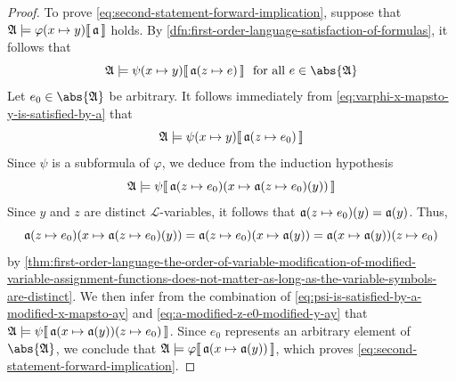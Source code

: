 \begin{proof}
    \vspace{0.3cm}
    \noindent
    To prove \eqref{eq:second-statement-forward-implication}, suppose that
    \( \folwffsatisfaction{\mathfrak{A}}{ \folfreevariablereplacement{\varphi}{x}{y} }{\mathfrak{a}} \) holds.
    By \cref{dfn:first-order-language-satisfaction-of-formulas}, it follows that
    \begin{equation}
        \label{eq:varphi-x-mapsto-y-is-satisfied-by-a}
        \folwffsatisfaction{\mathfrak{A}}{ \folfreevariablereplacement{\psi}{x}{y} }{ \folmodifiedvariableassignmentfunction{\mathfrak{a}}{z}{e} }
        \ \ \text{for all} \ e \in \abs{\mathfrak{A}}
    \end{equation}
    Let \( e_{0} \in \abs{\mathfrak{A}} \) be arbitrary. It follows immediately from \eqref{eq:varphi-x-mapsto-y-is-satisfied-by-a} that
    \begin{equation}
        \label{eq:psi-x-mapsto-y-is-satisfied-by-modified-a-z-mapsto-e0}
        \folwffsatisfaction{\mathfrak{A}}{ \folfreevariablereplacement{\psi}{x}{y} }{ \folmodifiedvariableassignmentfunction{\mathfrak{a}}{z}{e_{0}} }
    \end{equation}
    Since \( \psi \) is a subformula of \( \varphi \), we deduce from the induction hypothesis
    \begin{equation}
        \label{eq:psi-is-satisfied-by-a-modified-x-mapsto-ay}
        \folwffsatisfaction{\mathfrak{A}}{\psi}{ \folmodifiedvariableassignmentfunction{ \folmodifiedvariableassignmentfunction{\mathfrak{a}}{z}{e_{0}} }{x}{ \folmodifiedvariableassignmentfunction{\mathfrak{a}}{z}{e_{0}}(y) } }
    \end{equation}
    Since \( y \) and \( z \) are distinct \( \mathcal{L} \)-variables, it follows that \( \folmodifiedvariableassignmentfunction{\mathfrak{a}}{z}{e_{0}}(y) = \mathfrak{a}(y) \).
    Thus,
    \begin{equation}
        \label{eq:a-modified-z-e0-modified-y-ay}
        \folmodifiedvariableassignmentfunction{ \folmodifiedvariableassignmentfunction{\mathfrak{a}}{z}{e_{0}} }{x}{ \folmodifiedvariableassignmentfunction{\mathfrak{a}}{z}{e_{0}}(y) } = \folmodifiedvariableassignmentfunction{ \folmodifiedvariableassignmentfunction{\mathfrak{a}}{z}{e_{0}} }{x}{\mathfrak{a}(y)}
        = \folmodifiedvariableassignmentfunction{ \folmodifiedvariableassignmentfunction{\mathfrak{a}}{x}{\mathfrak{a}(y)} }{z}{e_{0}}
    \end{equation}
    by \cref{thm:first-order-language-the-order-of-variable-modification-of-modified-variable-assignment-functions-does-not-matter-as-long-as-the-variable-symbols-are-distinct}.
    We then infer from the combination of \eqref{eq:psi-is-satisfied-by-a-modified-x-mapsto-ay} and \eqref{eq:a-modified-z-e0-modified-y-ay} that
    \( \folwffsatisfaction{\mathfrak{A}}{\psi}{ \folmodifiedvariableassignmentfunction{ \folmodifiedvariableassignmentfunction{\mathfrak{a}}{x}{\mathfrak{a}(y)} }{z}{e_{0}} } \).
    Since \( e_{0} \) represents an arbitrary element of \( \abs{\mathfrak{A}} \), we conclude that
    \( \folwffsatisfaction{\mathfrak{A}}{\varphi}{ \folmodifiedvariableassignmentfunction{\mathfrak{a}}{x}{\mathfrak{a}(y)} } \), which proves \eqref{eq:second-statement-forward-implication}.


\end{proof}
